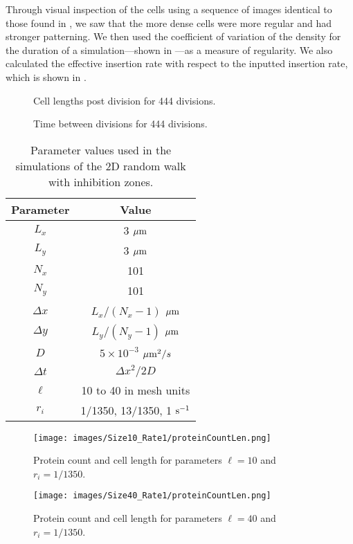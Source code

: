Through visual inspection of the cells using a sequence of images identical to those found in , we saw that the more dense cells were more regular and had stronger patterning. We then used the coefficient of variation of the density for the duration of a simulation---shown in ---as a measure of regularity. We also calculated the effective insertion rate with respect to the inputted insertion rate, which is shown in .

\begin{figure}
    \centering
    
    \caption{Cell lengths post division for 444 divisions.
    }
    \label{fig:cell_length_dist}
\end{figure}
\begin{figure}
    \centering
    
    \caption{Time between divisions for 444 divisions.
    }
    \label{fig:cell_cycle_duration}
\end{figure}

\begin{table}
\centering
	\begin{tabular}{| c | c |}
		\hline
		Parameter & Value \\
		\hline
		$L_x$ & 3 $\mu {\rm m}$ \\
		$L_y$ & 3 $\mu {\rm m}$  \\
		$N_x$ & 101 \\
		$N_y$ & 101 \\
		$\Delta x$ & $L_x/(N_x-1)$ $\mu {\rm m}$ \\
		$\Delta y$ & $L_y/(N_y-1)$ $\mu {\rm m}$\\
        $D$ & $5 \times 10^{-3}$ $\mu {\rm m}^2/s$ \\ %
		$\Delta t$ & $\Delta x^2/2D$ \\
		$\ell$ & 10 to 40 in mesh units \\
		$r_i$ & 1/1350, 13/1350, 1 ${\rm s}^{-1}$ \\
		\hline
	\end{tabular}
    \caption{Parameter values used in the simulations of the 2D random walk with inhibition zones.
    }
    \label{tab:rw_inhib_vals} 
\end{table}

\begin{figure}
\centering
\texttt{[image: images/Size10\_Rate1/proteinCountLen.png]}
\caption{Protein count and cell length for parameters $\ell=10$ and $r_i=1/1350$.
}
\label{fig:small-protein-number_cell-length_small}
\end{figure}
\begin{figure}
\centering
\texttt{[image: images/Size40\_Rate1/proteinCountLen.png]}
\caption{Protein count and cell length for parameters $\ell=40$ and $r_i=1/1350$.
}
\label{fig:small-protein-number_cell-length_large}
\end{figure}


